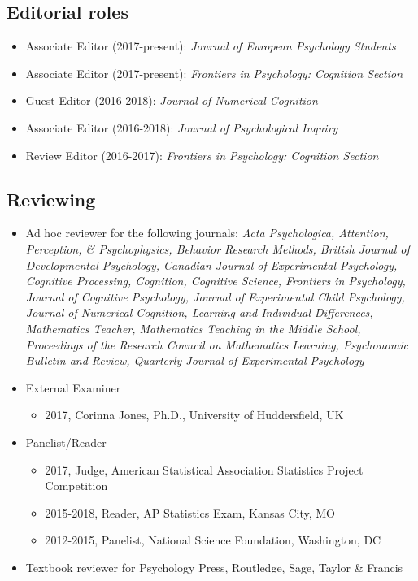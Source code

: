 \documentclass[article,10pt]{article}
\begin{document}
\subsection*{Editorial roles}
\label{sec:org52a4408}
\begin{itemize}
\item Associate Editor (2017-present): \emph{Journal of European Psychology Students}
\item Associate Editor (2017-present): \emph{Frontiers in Psychology: Cognition Section}
\item Guest Editor (2016-2018): \emph{Journal of Numerical Cognition}
\item Associate Editor (2016-2018): \emph{Journal of Psychological Inquiry}
\item Review Editor (2016-2017): \emph{Frontiers in Psychology: Cognition Section}
\end{itemize}
\subsection*{Reviewing}
\label{sec:org2f81303}

\begin{itemize}
\item Ad hoc reviewer for the following journals: \emph{Acta Psychologica, Attention, Perception, \& Psychophysics, Behavior Research Methods, British Journal of Developmental Psychology, Canadian Journal of Experimental Psychology, Cognitive Processing, Cognition, Cognitive Science, Frontiers in Psychology, Journal of Cognitive Psychology, Journal of Experimental Child Psychology, Journal of Numerical Cognition, Learning and Individual Differences, Mathematics Teacher, Mathematics Teaching in the Middle School, Proceedings of the Research Council on Mathematics Learning, Psychonomic Bulletin and Review, Quarterly Journal of Experimental Psychology}
\item External Examiner
\begin{itemize}
\item 2017, Corinna Jones, Ph.D., University of Huddersfield, UK
\end{itemize}
\item Panelist/Reader
\begin{itemize}
\item 2017, Judge, American Statistical Association Statistics Project Competition
\item 2015-2018, Reader, AP Statistics Exam, Kansas City, MO
\item 2012-2015, Panelist, National Science Foundation, Washington, DC
\end{itemize}

\item Textbook reviewer for Psychology Press, Routledge, Sage, Taylor \& Francis
\end{itemize}
\end{document}
